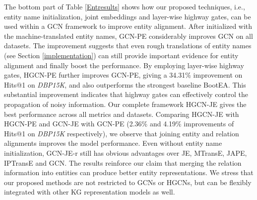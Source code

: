 \documentclass[11pt,a4paper]{article}
\begin{document}
The bottom part of Table \ref{Entresults} shows how our proposed techniques, i.e., entity name initialization, joint embeddings and
layer-wise highway gates, can be used within a GCN framework to improve entity alignment. After initialized with the machine-translated
entity names, GCN-PE considerably improves GCN on all datasets. The improvement suggests that even rough translations of entity names (see
Section \ref{implementation}) can still provide important evidence for entity alignment and finally boost the performance. By employing layer-wise highway
gates, HGCN-PE further improves GCN-PE, giving a 34.31\% improvement on Hits@1 on \textit{DBP15K}, and also outperforms the strongest baseline BootEA. This substantial improvement indicates that highway gates can effectively control the propagation of noisy information. Our complete
framework HGCN-JE gives the best performance across all metrics and datasets. Comparing HGCN-JE with HGCN-PE and GCN-JE with GCN-PE (2.36\%
and 4.19\% improvements of Hits@1 on \textit{DBP15K} respectively), we observe that joining entity and relation alignments
improves the model performance. Even without entity name initialization, GCN-JE-r still has obvious advantages over JE, MTransE, JAPE,
IPTransE and GCN. The results reinforce our claim that merging the relation information into entities can produce better entity
representations. We stress that our proposed methods are not restricted to GCNs or HGCNs, but can be flexibly integrated with other KG
representation models as well.
\end{document}
